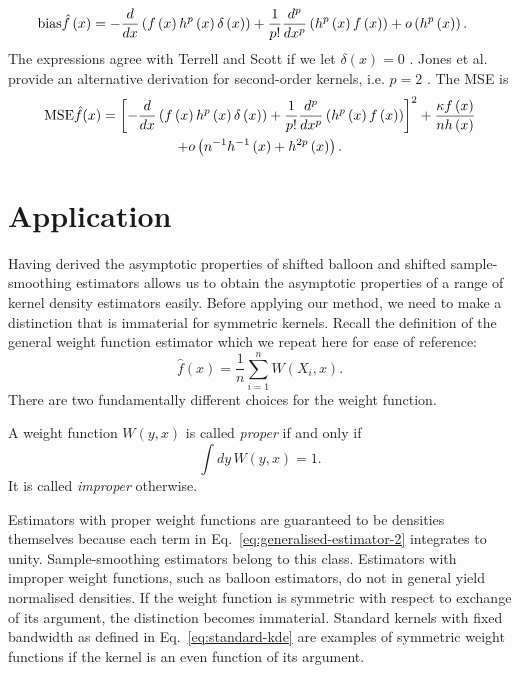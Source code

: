 \begin{align}
\mathrm{bias}\hat{f}\left(x\right) & =-\frac{d}{dx}\left(f\left(x\right)h^{p}\left(x\right)\delta\left(x\right)\right)+\frac{1}{p!}\frac{d^{p}}{dx^{p}}\left(h^{p}\left(x\right)f\left(x\right)\right)+o\left(h^{p}\left(x\right)\right).\label{eq:smoothing-bias}
\end{align}
The expressions agree with Terrell and Scott if we let $\delta\left(x\right)=0$ \cite{Terrell1992}. Jones et al. provide an alternative derivation for second-order kernels, i.e. $p=2$ \cite{Jones1994}. The MSE is 
\begin{multline*}
\mathrm{MSE}\hat{f}(x)=\left[-\frac{d}{dx}\left(f\left(x\right)h^{p}\left(x\right)\delta\left(x\right)\right)+\frac{1}{p!}\frac{d^{p}}{dx^{p}}\left(h^{p}\left(x\right)f\left(x\right)\right)\right]^{2}+\frac{\kappa f\left(x\right)}{nh\left(x\right)}\\
+o\left(n^{-1}h^{-1}\left(x\right)+h^{2p}\left(x\right)\right).
\end{multline*}



\section{Application\label{sec:application}}

Having derived the asymptotic properties of shifted balloon and shifted sample-smoothing estimators allows us to obtain the asymptotic properties of a range of kernel density estimators easily. Before applying our method, we need to make a distinction that is immaterial for symmetric kernels. Recall the definition of the general weight function estimator which we repeat here for ease of reference: 
\begin{equation}
\hat{f}\left(x\right)=\frac{1}{n}\sum_{i=1}^{n}W\left(X_{i},x\right).\label{eq:generalised-estimator-2}
\end{equation}
There are two fundamentally different choices for the weight function.
\begin{defn}
A weight function $W\left(y,x\right)$ is called \emph{proper} if and only if 
\[
\int dy\,W\left(y,x\right)=1.
\]
It is called \emph{improper} otherwise.
\end{defn}
Estimators with proper weight functions are guaranteed to be densities themselves because each term in Eq.~\eqref{eq:generalised-estimator-2} integrates to unity. Sample-smoothing estimators belong to this class. Estimators with improper weight functions, such as balloon estimators, do not in general yield normalised densities. If the weight function is symmetric with respect to exchange of its argument, the distinction becomes immaterial. Standard kernels with fixed bandwidth as defined in Eq.~\eqref{eq:standard-kde} are examples of symmetric weight functions if the kernel is an even function of its argument.


